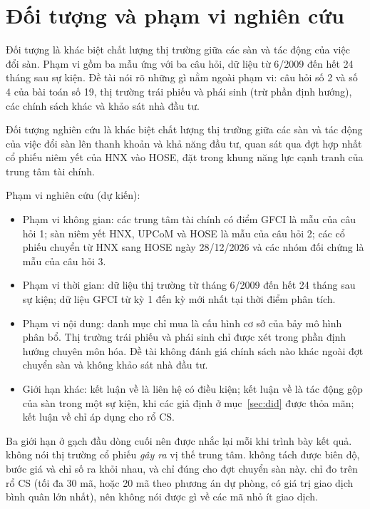 \section{Đối tượng và phạm vi nghiên cứu}\label{sec:phamvi}

\begin{tomtat}
Đối tượng là khác biệt chất lượng thị trường giữa các sàn và tác động của việc đổi sàn. Phạm vi gồm ba mẫu ứng với ba câu hỏi, dữ liệu từ 6/2009 đến hết 24 tháng sau sự kiện. Đề tài nói rõ những gì nằm ngoài phạm vi: câu hỏi số 2 và số 4 của bài toán số 19, thị trường trái phiếu và phái sinh (trừ phần định hướng), các chính sách khác và khảo sát nhà đầu tư.
\end{tomtat}

Đối tượng nghiên cứu là khác biệt chất lượng thị trường giữa các sàn và tác động của việc đổi sàn lên thanh khoản và khả năng đầu tư, quan sát qua đợt hợp nhất cổ phiếu niêm yết của HNX vào HOSE, đặt trong khung năng lực cạnh tranh của trung tâm tài chính.

Phạm vi nghiên cứu (dự kiến):
\begin{itemize}
\item[+] Phạm vi không gian: các trung tâm tài chính có điểm GFCI là mẫu của câu hỏi 1; sàn niêm yết HNX, UPCoM và HOSE là mẫu của câu hỏi 2; các cổ phiếu chuyển từ HNX sang HOSE ngày 28/12/2026 và các nhóm đối chứng là mẫu của câu hỏi 3.
\item[+] Phạm vi thời gian: dữ liệu thị trường từ tháng 6/2009 đến hết 24 tháng sau sự kiện; dữ liệu GFCI từ kỳ 1 đến kỳ mới nhất tại thời điểm phân tích.
\item[+] Phạm vi nội dung: danh mục chỉ mua là cấu hình cơ sở của bảy mô hình phân bổ. Thị trường trái phiếu và phái sinh chỉ được xét trong phần định hướng chuyên môn hóa. Đề tài không đánh giá chính sách nào khác ngoài đợt chuyển sàn và không khảo sát nhà đầu tư.
\item[+] Giới hạn khác: kết luận về  là liên hệ có điều kiện; kết luận về  là tác động gộp của sàn trong một sự kiện, khi các giả định ở mục~\ref{sec:did} được thỏa mãn; kết luận về  chỉ áp dụng cho rổ CS.
\end{itemize}

Ba giới hạn ở gạch đầu dòng cuối nên được nhắc lại mỗi khi trình bày kết quả.  không nói thị trường cổ phiếu \emph{gây ra} vị thế trung tâm.  không tách được biên độ, bước giá và chỉ số ra khỏi nhau, và chỉ đúng cho đợt chuyển sàn này.  chỉ đo trên rổ CS (tối đa 30 mã, hoặc 20 mã theo phương án dự phòng, có giá trị giao dịch bình quân lớn nhất), nên không nói được gì về các mã nhỏ ít giao dịch.

